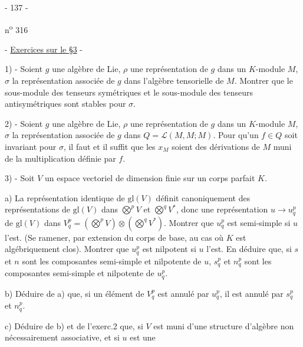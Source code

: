 \begin{center}- 137 -\end{center}
\hfill n\textsuperscript{o} 316
\begin{center}- \uline{Exercices sur le §3} -\end{center}

1) - Soient $g$ une algèbre de Lie, $\rho$ une représentation de $g$ dans un $K$-module $M$, $\sigma$ la représentation associée de $g$ dans l'algèbre tensorielle de $M$. Montrer que le sous-module des tenseurs symétriques et le sous-module des tenseurs antisymétriques sont stables pour $\sigma$.

2) - Soient $g$ une algèbre de Lie, $\rho$ une représentation de $g$ dans un $K$-module $M$, $\sigma$ la représentation associée de $g$ dans $Q=\mathcal L(M,M;M)$. Pour qu'un $f\in Q$ soit invariant pour $\sigma$, il faut et il suffit que les $x_M$ soient des dérivations de $M$ muni de la multiplication définie par $f$.

3) - Soit $V$ un espace vectoriel de dimension finie sur un corps parfait $K$.

a) La représentation identique de $\mathrm{gl}(V)$ définit canoniquement des représentations de $\mathrm{gl}(V)$ dans $\overset{p}{\bigotimes}V$ et $\overset{q}{\bigotimes}V^*$, donc une représentation $u\longrightarrow u_q^p$ de $\mathrm{gl}(V)$ dans $V_q^p=(\overset{p}{\bigotimes}V)\otimes(\overset{q}{\bigotimes}V^*)$. Montrer que $u_q^p$ est semi-simple si $u$ l'est. (Se ramener, par extension du corps de base, au cas où $K$ est algébriquement clos). Montrer que $u_q^p$ est nilpotent si $u$ l'est. En déduire que, si $s$ et $n$ sont les composantes semi-simple et nilpotente de $u$, $s_q^p$ et $n_q^p$ sont les composantes semi-simple et nilpotente de $u_q^p$.

b) Déduire de a) que, si un élément de $V_q^p$ est annulé par $u_q^p$, il est annulé par $s_q^p$ et $n_q^p$.

c) Déduire de b) et de l'exerc.2 que, si $V$ est muni d'une structure d'algèbre non nécessairement associative, et si $u$ est une
